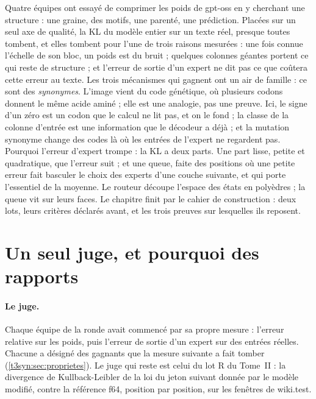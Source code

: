 \begin{enbref}
Quatre équipes ont essayé de comprimer les poids de gpt-oss en y cherchant une structure : une graine, des motifs, une parenté, une prédiction. Placées sur un seul axe de qualité, la KL du modèle entier sur un texte réel, presque toutes tombent, et elles tombent pour l'une de trois raisons mesurées : une fois connue l'échelle de son bloc, un poids est du bruit ; quelques colonnes géantes portent ce qui reste de structure ; et l'erreur de sortie d'un expert ne dit pas ce que coûtera cette erreur au texte. Les trois mécanismes qui gagnent ont un air de famille : ce sont des \emph{synonymes}. L'image vient du code génétique, où plusieurs codons donnent le même acide aminé ; elle est une analogie, pas une preuve. Ici, le signe d'un zéro est un codon que le calcul ne lit pas, et on le fond ; la classe de la colonne d'entrée est une information que le décodeur a déjà ; et la mutation synonyme change des codes là où les entrées de l'expert ne regardent pas. Pourquoi l'erreur d'expert trompe : la KL a deux parts. Une part lisse, petite et quadratique, que l'erreur suit ; et une queue, faite des positions où une petite erreur fait basculer le choix des experts d'une couche suivante, et qui porte l'essentiel de la moyenne. Le routeur découpe l'espace des états en polyèdres ; la queue vit sur leurs faces. Le chapitre finit par le cahier de construction : deux lots, leurs critères déclarés avant, et les trois preuves sur lesquelles ils reposent.
\end{enbref}

\section{Un seul juge, et pourquoi des rapports}\label{t3syn:sec:juge}

\paragraph{Le juge.} Chaque équipe de la ronde avait commencé par sa propre mesure : l'erreur relative sur les poids, puis l'erreur de sortie d'un expert sur des entrées réelles. Chacune a désigné des gagnants que la mesure suivante a fait tomber (\cref{t3syn:sec:proprietes}). Le juge qui reste est celui du lot R du Tome~II : la divergence de Kullback-Leibler \parencite{kullback1951} de la loi du jeton suivant donnée par le modèle modifié, contre la référence f64, position par position, sur les fenêtres de wiki.test.

